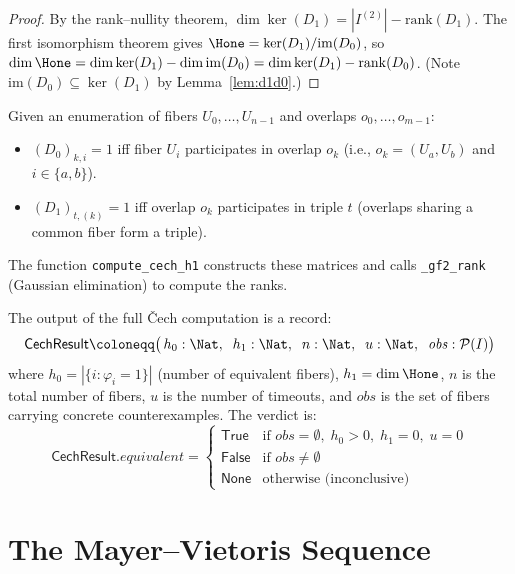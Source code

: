\begin{proof}
By the rank--nullity theorem, $\dim \ker(D_1) = |I^{(2)}| - \mathrm{rank}(D_1)$.
The first isomorphism theorem gives
$\Hone = \ker(D_1) / \mathrm{im}(D_0)$, so
$\dim \Hone = \dim \ker(D_1) - \dim \mathrm{im}(D_0) = \dim \ker(D_1) - \mathrm{rank}(D_0)$.
(Note $\mathrm{im}(D_0) \subseteq \ker(D_1)$ by Lemma~\ref{lem:d1d0}.)
\end{proof}

\begin{definition}
\label{def:d0d1-matrices}
Given an enumeration of fibers $U_0, \ldots, U_{n-1}$ and overlaps
$o_0, \ldots, o_{m-1}$:
\begin{itemize}
  \item $(D_0)_{k,i} = 1$ iff fiber $U_i$ participates in overlap $o_k$
    (i.e., $o_k = (U_a, U_b)$ and $i \in \{a, b\}$).
  \item $(D_1)_{t,(k)} = 1$ iff overlap $o_k$ participates in triple
    $t$ (overlaps sharing a common fiber form a triple).
\end{itemize}
The function \texttt{compute\_cech\_h1} constructs these matrices
and calls \texttt{\_gf2\_rank} (Gaussian elimination) to compute
the ranks.
\end{definition}

\begin{definition}
\label{def:cech-result}
The output of the full \v{C}ech computation is a record:
\[
  \mathsf{CechResult} \coloneqq
  \bigl(\,
    h_0 : \Nat,\;\;
    h_1 : \Nat,\;\;
    n : \Nat,\;\;
    u : \Nat,\;\;
    \mathit{obs} : \mathcal{P}(I)
  \bigr)
\]
where $h_0 = |\{i : \varphi_i = 1\}|$ (number of equivalent fibers),
$h_1 = \dim \Hone$, $n$ is the total number of fibers, $u$ is the
number of timeouts, and $\mathit{obs}$ is the set of fibers carrying
concrete counterexamples.  The verdict is:
\[
  \mathsf{CechResult}.\mathit{equivalent} =
  \begin{cases}
    \mathsf{True}  & \text{if } \mathit{obs} = \emptyset,\; h_0 > 0,\;
                      h_1 = 0,\; u = 0 \\
    \mathsf{False} & \text{if } \mathit{obs} \neq \emptyset \\
    \mathsf{None}  & \text{otherwise (inconclusive)}
  \end{cases}
\]
\end{definition}


\chapter{The Mayer--Vietoris Sequence}
\label{ch:mayer-vietoris}

